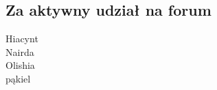 \ornamentbreak

\subsection*{Za aktywny udział na forum}
\begin{multicols}{4}
Hiacynt \\
Nairda \\
Olishia \\
pąkiel
\end{multicols}
